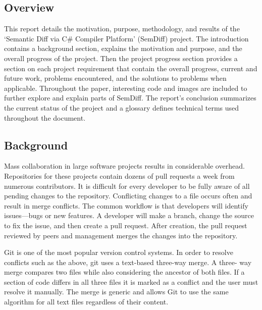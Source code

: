 \documentclass[draftclsnofoot,onecolumn]{IEEEtran}
\begin{document}
\subsection{Overview}%

This report details the motivation, purpose, methodology, and results of the 
`Semantic Diff via C\# Compiler Platform' (SemDiff) project. The introduction 
contains a background section, explains the motivation and purpose, and the 
overall progress of the project. Then the project progress section provides a
section on each project requirement that contain the overall progress, current 
and future work, problems encountered, and the solutions to problems when 
applicable. Throughout the paper, interesting code and images are included to 
further explore and explain parts of SemDiff. The report's conclusion 
summarizes the current status of the project and a glossary defines technical 
terms used throughout the document.

\subsection{Background}%

Mass collaboration in large software projects results in considerable 
overhead. Repositories for these projects contain dozens of pull requests a 
week from numerous contributors. It is difficult for every developer to be 
fully aware of all pending changes to the repository. Conflicting changes to a 
file occurs often and result in merge conflicts. The common workflow is that 
developers will identify issues---bugs or new features. A developer will make 
a branch, change the source to fix the issue, and then create a pull request. 
After creation, the pull request reviewed by peers and management merges the 
changes into the repository.

Git is one of the most popular version control systems. In order to resolve 
conflicts such as the above, git uses a text-based three-way merge. A three-
way merge compares two files while also considering the ancestor of both 
files. If a section of code differs in all three files it is marked as a 
conflict and the user must resolve it manually. The merge is generic and 
allows Git to use the same algorithm for all text files regardless of their 
content.
\end{document}
